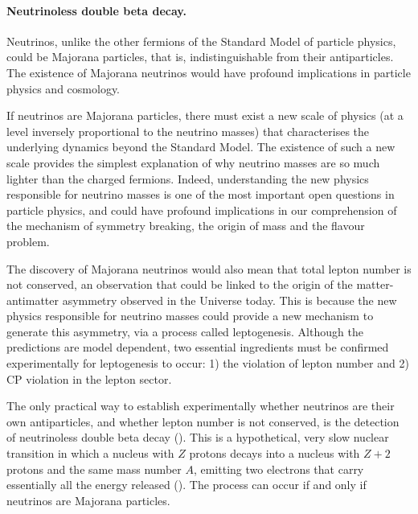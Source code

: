 \paragraph{Neutrinoless double beta decay.}
Neutrinos, unlike the other fermions of the Standard Model of particle physics, could be Majorana particles, that is, indistinguishable from their antiparticles. The existence of Majorana neutrinos would have profound implications in particle physics and cosmology. 

 If neutrinos are Majorana particles, there must exist a new scale of physics (at a level inversely proportional to the neutrino masses) that characterises the underlying dynamics beyond the Standard Model. The existence of such a new scale provides the simplest explanation of why neutrino masses are so much lighter than the charged fermions. Indeed, understanding the new physics responsible for neutrino masses is one of the most important open questions in particle physics, and could have profound implications in our comprehension of the mechanism of symmetry breaking, the origin of mass and the flavour problem. 

The discovery of Majorana neutrinos would also mean that total lepton number is not conserved, an observation that could be linked to the origin of the matter-antimatter asymmetry observed in the Universe today. This is because the new physics responsible for neutrino masses could provide a new mechanism to generate this asymmetry, via a process called leptogenesis. Although the predictions are model dependent, two essential ingredients must be confirmed experimentally for leptogenesis to occur: 1) the violation of lepton number and 2) CP violation in the lepton sector. 

The only practical way to establish experimentally whether neutrinos are their own antiparticles, and whether lepton number is not conserved, is the detection of neutrinoless double beta decay (\bbonu). This is a hypothetical, very slow nuclear transition in which a nucleus with $Z$ protons decays into a nucleus with $Z+2$ protons and the same mass number $A$, emitting two electrons that carry essentially all the energy released (\Qbb). The process can occur if and only if neutrinos are Majorana particles. 

